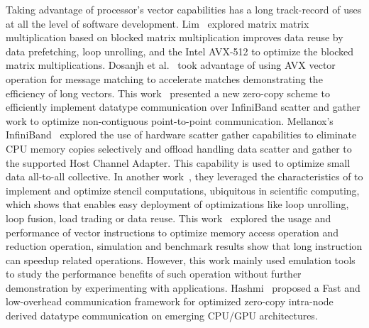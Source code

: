 \documentclass[conference]{IEEEtran}
\begin{document}
Taking advantage of processor's vector capabilities has a long track-record of
uses at all the level of software development.
%
Lim~\cite{Lim2018} explored matrix matrix multiplication based on blocked matrix multiplication
improves data reuse by data prefetching, loop unrolling, and the Intel AVX-512 to optimize
the blocked matrix multiplications.
%
Dosanjh et al.~\cite{tag-match} took advantage of using AVX vector operation for
\mpi message matching to accelerate matches demonstrating the efficiency
of long vectors.
%
This work~\cite{Berlin04} presented a new
zero-copy scheme to efficiently implement datatype communication over InfiniBand
scatter and gather work to optimize non-contiguous point-to-point communication.
%
Mellanox's InfiniBand~\cite{Gainaru2016} explored the use of hardware scatter
gather capabilities to eliminate CPU memory copies selectively and offload handling
data scatter and gather to the supported Host Channel Adapter. This capability is
used to optimize small data all-to-all collective.
%
In another work~\cite{sve-stencil}, they leveraged the characteristics of \sve to implement and optimize
stencil computations, ubiquitous in scientific computing, which shows
that \sve enables easy deployment of optimizations like loop unrolling,
loop fusion, load trading or data reuse.
%
This work~\cite{dongsve} explored the usage and performance of \sve vector instructions to optimize
memory access operation and reduction operation, simulation and benchmark results show that \sve
long instruction can speedup related operations. However, this work mainly used emulation tools to
study the performance benefits of such operation without further demonstration by experimenting
with applications.
%
Hashmi~\cite{ASHMI20201} proposed a Fast and low-overhead communication framework
for optimized zero-copy intra-node derived datatype communication on emerging CPU/GPU architectures.
%
\end{document}
